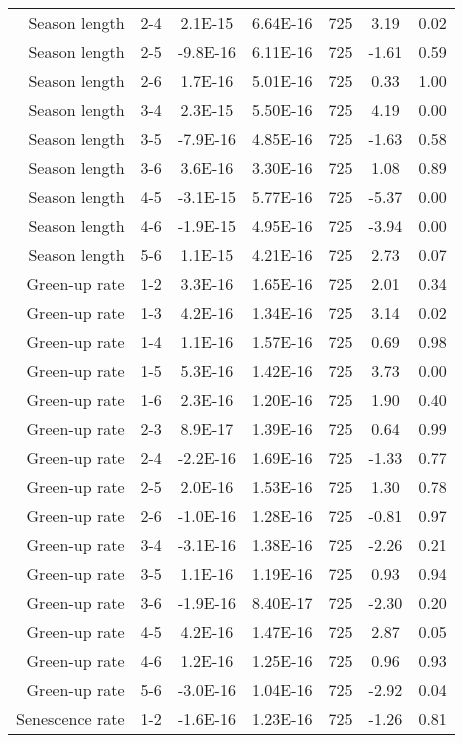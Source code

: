 \begin{table}[H]
\begin{tabular}{rcccccc}
  Season length & 2-4 & 2.1E-15 & 6.64E-16 & 725 & 3.19 & 0.02 \\ 
  Season length & 2-5 & -9.8E-16 & 6.11E-16 & 725 & -1.61 & 0.59 \\ 
  Season length & 2-6 & 1.7E-16 & 5.01E-16 & 725 & 0.33 & 1.00 \\ 
  Season length & 3-4 & 2.3E-15 & 5.50E-16 & 725 & 4.19 & 0.00 \\ 
  Season length & 3-5 & -7.9E-16 & 4.85E-16 & 725 & -1.63 & 0.58 \\ 
  Season length & 3-6 & 3.6E-16 & 3.30E-16 & 725 & 1.08 & 0.89 \\ 
  Season length & 4-5 & -3.1E-15 & 5.77E-16 & 725 & -5.37 & 0.00 \\ 
  Season length & 4-6 & -1.9E-15 & 4.95E-16 & 725 & -3.94 & 0.00 \\ 
  Season length & 5-6 & 1.1E-15 & 4.21E-16 & 725 & 2.73 & 0.07 \\ 
  Green-up rate & 1-2 & 3.3E-16 & 1.65E-16 & 725 & 2.01 & 0.34 \\ 
  Green-up rate & 1-3 & 4.2E-16 & 1.34E-16 & 725 & 3.14 & 0.02 \\ 
  Green-up rate & 1-4 & 1.1E-16 & 1.57E-16 & 725 & 0.69 & 0.98 \\ 
  Green-up rate & 1-5 & 5.3E-16 & 1.42E-16 & 725 & 3.73 & 0.00 \\ 
  Green-up rate & 1-6 & 2.3E-16 & 1.20E-16 & 725 & 1.90 & 0.40 \\ 
  Green-up rate & 2-3 & 8.9E-17 & 1.39E-16 & 725 & 0.64 & 0.99 \\ 
  Green-up rate & 2-4 & -2.2E-16 & 1.69E-16 & 725 & -1.33 & 0.77 \\ 
  Green-up rate & 2-5 & 2.0E-16 & 1.53E-16 & 725 & 1.30 & 0.78 \\ 
  Green-up rate & 2-6 & -1.0E-16 & 1.28E-16 & 725 & -0.81 & 0.97 \\ 
  Green-up rate & 3-4 & -3.1E-16 & 1.38E-16 & 725 & -2.26 & 0.21 \\ 
  Green-up rate & 3-5 & 1.1E-16 & 1.19E-16 & 725 & 0.93 & 0.94 \\ 
  Green-up rate & 3-6 & -1.9E-16 & 8.40E-17 & 725 & -2.30 & 0.20 \\ 
  Green-up rate & 4-5 & 4.2E-16 & 1.47E-16 & 725 & 2.87 & 0.05 \\ 
  Green-up rate & 4-6 & 1.2E-16 & 1.25E-16 & 725 & 0.96 & 0.93 \\ 
  Green-up rate & 5-6 & -3.0E-16 & 1.04E-16 & 725 & -2.92 & 0.04 \\ 
  Senescence rate & 1-2 & -1.6E-16 & 1.23E-16 & 725 & -1.26 & 0.81 \\ 

\end{tabular}
\end{table}
